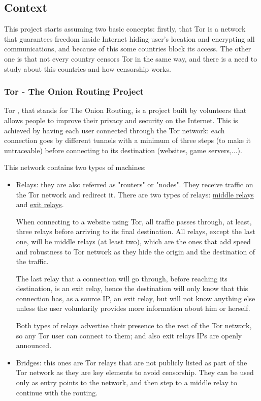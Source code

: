 \subsection{Context}
This project starts assuming two basic concepts: firstly, that Tor is a network that guarantees freedom inside Internet hiding user's location and encrypting all communications, and because of this some countries block its access. The other one is that not every country censors Tor in the same way, and there is a need to study about this countries and how censorship works.

\subsubsection{Tor - The Onion Routing Project}
\label{sssec:tor}
Tor \cite{TorWeb, EffTor}, that stands for The Onion Routing, is a project built by volunteers that allows people to improve their privacy and security on the Internet. This is achieved by having each user connected through the Tor network: each connection goes by different tunnels with a minimum of three steps (to make it untraceable) before connecting to its destination (websites, game servers,...).

This network contains two types of machines: 
\begin{itemize}
\item Relays: they are also referred as "routers" or "nodes". They receive traffic on the Tor network and redirect it. There are two types of relays: \underline{middle relays} and \underline{exit relays}.
 
When connecting to a website using Tor, all traffic passes through, at least, three relays before arriving to its final destination. All relays, except the last one, will be middle relays (at least two), which are the ones that add speed and robustness to Tor network as they hide the origin and the destination of the traffic.  

The last relay that a connection will go through, before reaching its destination, is an exit relay, hence the destination will only know that this connection has, as a source IP, an exit relay, but will not know anything else unless the user voluntarily provides more information about him or herself.

Both types of relays advertise their presence to the rest of the Tor network, so any Tor user can connect to them; and also exit relays IPs are openly announced.

\item Bridges: this ones are Tor relays that are not publicly listed as part of the Tor network as they are key elements to avoid censorship. They can be used only as entry points to the network, and then step to a middle relay to continue with the routing.
\end{itemize}

